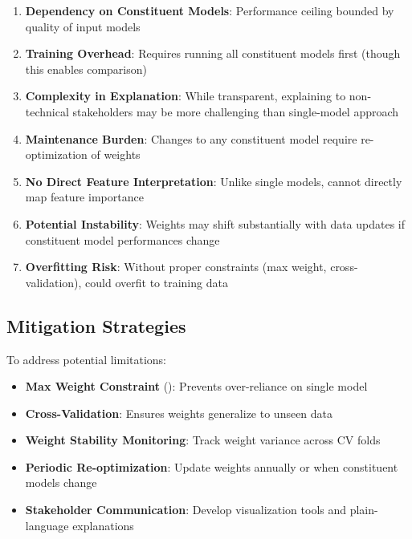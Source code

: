 \begin{enumerate}
    \item \textbf{Dependency on Constituent Models}: Performance ceiling bounded by quality of input models
    
    \item \textbf{Training Overhead}: Requires running all constituent models first (though this enables comparison)
    
    \item \textbf{Complexity in Explanation}: While transparent, explaining to non-technical stakeholders may be more challenging than single-model approach
    
    \item \textbf{Maintenance Burden}: Changes to any constituent model require re-optimization of weights
    
    \item \textbf{No Direct Feature Interpretation}: Unlike single models, cannot directly map feature importance
    
    \item \textbf{Potential Instability}: Weights may shift substantially with data updates if constituent model performances change
    
    \item \textbf{Overfitting Risk}: Without proper constraints (max weight, cross-validation), could overfit to training data
\end{enumerate}

\subsection{Mitigation Strategies}

To address potential limitations:

\begin{itemize}
    \item \textbf{Max Weight Constraint} (\ModelElevenMaxWeight{}): Prevents over-reliance on single model
    \item \textbf{Cross-Validation}: Ensures weights generalize to unseen data
    \item \textbf{Weight Stability Monitoring}: Track weight variance across CV folds
    \item \textbf{Periodic Re-optimization}: Update weights annually or when constituent models change
    \item \textbf{Stakeholder Communication}: Develop visualization tools and plain-language explanations
\end{itemize}

